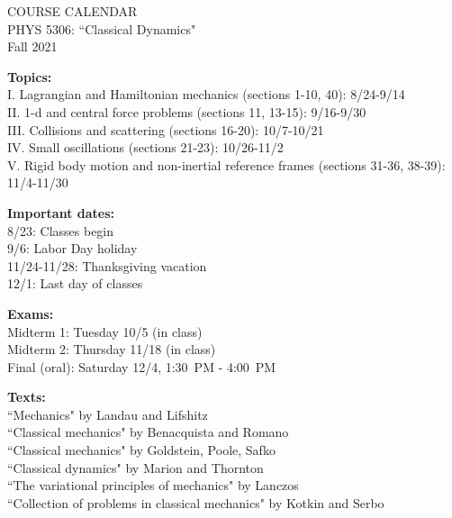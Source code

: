 \documentclass[11pt]{NSF}
\begin{document}
\begin{center}
COURSE CALENDAR\\
PHYS 5306: ``Classical Dynamics"\\
Fall 2021\\
\end{center}

{\bf Topics:}\\
I. Lagrangian and Hamiltonian mechanics (sections 1-10,  40):
8/24-9/14\\
II. 1-d and central force problems (sections 11, 13-15): 9/16-9/30\\
III. Collisions and scattering (sections 16-20): 10/7-10/21\\
IV. Small oscillations (sections 21-23): 10/26-11/2\\
V. Rigid body motion and non-inertial reference frames (sections
31-36, 38-39): 11/4-11/30

{\bf Important dates:}\\
8/23: Classes begin\\
9/6: Labor Day holiday\\
11/24-11/28: Thanksgiving vacation\\
12/1: Last day of classes

{\bf Exams:}\\
Midterm 1: Tuesday 10/5 (in class)\\
Midterm 2: Thursday 11/18 (in class)\\
Final (oral): Saturday 12/4, 1:30~PM - 4:00~PM

{\bf Texts:}\\
``Mechanics" by Landau and Lifshitz\\
``Classical mechanics" by Benacquista and Romano\\
``Classical mechanics" by Goldstein, Poole, Safko\\
``Classical dynamics" by Marion and Thornton\\
``The variational principles of mechanics" by Lanczos\\
``Collection of problems in classical mechanics" by Kotkin and Serbo\\
\end{document}
